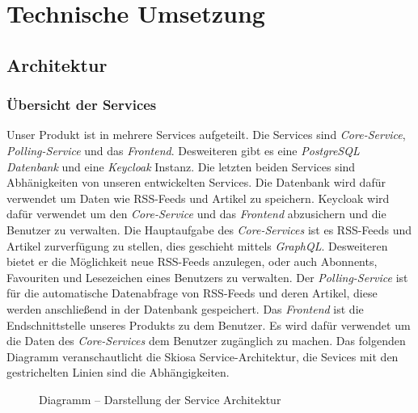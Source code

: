 
\chapter{Technische Umsetzung}


\section{Architektur}

\subsection{Übersicht der Services}
Unser Produkt ist in mehrere Services aufgeteilt. Die Services sind \textit{Core-Service}, \textit{Polling-Service} und das \textit{Frontend}.
Desweiteren gibt es eine \textit{PostgreSQL Datenbank} und eine \textit{Keycloak} Instanz. Die letzten beiden Services sind Abhänigkeiten von unseren entwickelten Services.
Die Datenbank wird dafür verwendet um Daten wie RSS-Feeds und Artikel zu speichern.
Keycloak wird dafür verwendet um den \textit{Core-Service} und das \textit{Frontend} abzusichern und die Benutzer zu verwalten.
Die Hauptaufgabe des \textit{Core-Services} ist es RSS-Feeds und Artikel zurverfügung zu stellen, dies geschieht mittels \textit{GraphQL}. Desweiteren bietet er die Möglichkeit
neue RSS-Feeds anzulegen, oder auch Abonnents, Favouriten und Lesezeichen eines Benutzers zu verwalten. Der \textit{Polling-Service} ist für die automatische Datenabfrage von RSS-Feeds und
deren Artikel, diese werden anschließend in der Datenbank gespeichert. Das \textit{Frontend} ist die Endschnittstelle unseres Produkts zu dem Benutzer.
Es wird dafür verwendet um die Daten des \textit{Core-Services} dem Benutzer zugänglich zu machen.
Das folgenden Diagramm veranschautlicht die Skiosa Service-Architektur, die Sevices mit den gestrichelten Linien sind die Abhängigkeiten.
\begin{figure}[!htbp]
    \centering    
    \usetikzlibrary{positioning}
\caption{Diagramm – Darstellung der Service Architektur}
\end{figure}

